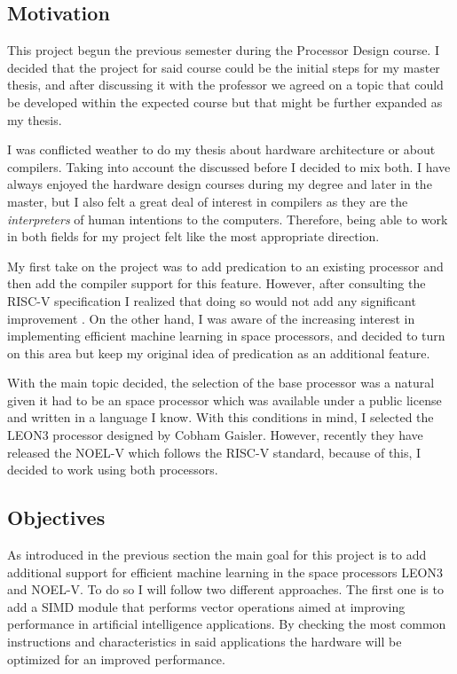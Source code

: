 
\subsection{Motivation}

This project begun the previous semester during the Processor Design course.
I decided that the project for said course could be the initial steps for my
master thesis, and after discussing it with the professor we agreed on a topic
that could be developed within the expected course but that might be further 
expanded as my thesis. 

\medbreak
I was conflicted weather to do my thesis about hardware architecture or about
compilers. Taking into account the discussed before I decided to mix both. I 
have always enjoyed the hardware design courses during my degree and later in
the master, but I also felt a great deal of interest in compilers as they are 
the \textit{interpreters} of human intentions to the computers. Therefore, 
being able to work in both fields for my project felt like the most appropriate 
direction. 

\medbreak
My first take on the project was to add predication to an existing processor
and then add the compiler support for this feature. However, after consulting
the RISC-V specification I realized that doing so would not add any significant
improvement \cite{RVSpec}. On the other hand, I was aware of the increasing 
interest in implementing efficient machine learning in space processors, and 
decided to turn on this area but keep my original idea of predication as an 
additional feature. 

\medbreak
With the main topic decided, the selection of the base processor was a natural 
given it had to be an space processor which was available under a public license
and written in a language I know. With this conditions in mind, I selected the
LEON3 \cite{L3} processor designed by Cobham Gaisler. However, recently they have
released the NOEL-V \cite{NV} which follows the RISC-V standard, because of this,
I decided to work using both processors.

\subsection{Objectives}

As introduced in the previous section the main goal for this project is to add 
additional support for efficient machine learning in the space processors LEON3
and NOEL-V. To do so I will follow two different approaches. The first one is to
add a SIMD module that performs vector operations aimed at improving performance
in artificial intelligence applications. By checking the most common instructions
and characteristics in said applications the hardware will be optimized for an
improved performance. 

